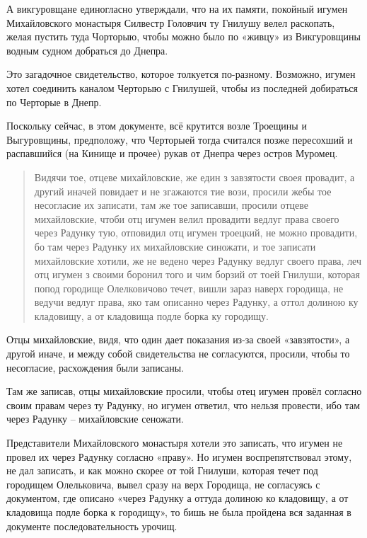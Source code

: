 А викгуровщане единогласно утверждали, что на их памяти, покойный игумен Михайловского монастыря Силвестр Головчич ту Гнилушу велел раскопать, желая пустить туда Чорторыю, чтобы можно было по «живцу» из Викгуровщины водным судном добраться до Днепра.

Это загадочное свидетельство, которое толкуется по-разному. Возможно, игумен хотел соединить каналом Черторыю с Гнилушей, чтобы из последней добираться по Черторые в Днепр.

Поскольку сейчас, в этом документе, всё крутится возле Троещины и Выгуровщины, предположу, что Черторыей тогда считался позже пересохший и распавшийся (на Кинище и прочее) рукав от Днепра через остров Муромец. 

\begin{quotation}
Видячи тое, отцеве михайловские, же един з завзятости своея провадит, а другий иначей повидает и не згажаются тие вози, просили жебы тое несогласие их записати, там же тое записавши, просили отцеве михайловские, чтоби отц игумен велил провадити ведлуг права своего через Радунку тую, отповидил отц игумен троецкий, не можно провадити, бо там через Радунку их михайловские синожати, и тое записати михайловские хотили, же не ведено через Радунку ведлуг своего права, леч отц игумен з своими боронил того и чим борзий от тоей Гнилуши, которая попод городище Олелковичово течет, вишли зараз наверх городища, не ведучи ведлуг права, яко там описанно через Радунку, а оттол долиною ку кладовищу, а от кладовища подле борка ку городищу.
\end{quotation}

Отцы михайловские, видя, что один дает показания из-за своей «завзятости», а другой иначе, и между собой свидетельства не согласуются, просили, чтобы то несогласие, расхождения были записаны.

Там же записав, отцы михайловские просили, чтобы отец игумен провёл согласно своим правам через ту Радунку, но игумен ответил, что нельзя провести, ибо там через Радунку – михайловские сеножати.

Представители Михайловского монастыря хотели это записать, что игумен не провел их через Радунку согласно «праву». Но игумен воспрепятствовал этому, не дал записать, и как можно скорее от той Гнилуши, которая течет под городищем Олельковича, вывел сразу на верх Городища, не согласуясь с документом, где описано «через Радунку а оттуда долиною ко кладовищу, а от кладовища подле борка к городищу», то бишь не была пройдена вся заданная в документе последовательность урочищ.


